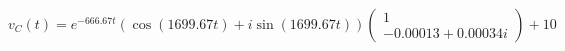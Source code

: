 \documentclass[preview]{standalone}
\begin{document}
\begin{center}
\[
                                v_C(t) = e^{-666.67t} \left( \cos(1699.67t) + i \sin(1699.67t) \right)
                                \begin{pmatrix} 
                                1 \\ 
                                -0.00013 + 0.00034i 
                                \end{pmatrix} + 10
                        \]
\end{center}
\end{document}
